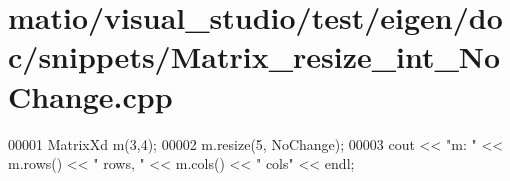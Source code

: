 \hypertarget{matio_2visual__studio_2test_2eigen_2doc_2snippets_2_matrix__resize__int___no_change_8cpp_source}{}\section{matio/visual\+\_\+studio/test/eigen/doc/snippets/\+Matrix\+\_\+resize\+\_\+int\+\_\+\+No\+Change.cpp}
\label{matio_2visual__studio_2test_2eigen_2doc_2snippets_2_matrix__resize__int___no_change_8cpp_source}

\begin{DoxyCode}
00001 MatrixXd m(3,4);
00002 m.resize(5, NoChange);
00003 cout << \textcolor{stringliteral}{"m: "} << m.rows() << \textcolor{stringliteral}{" rows, "} << m.cols() << \textcolor{stringliteral}{" cols"} << endl;
\end{DoxyCode}
